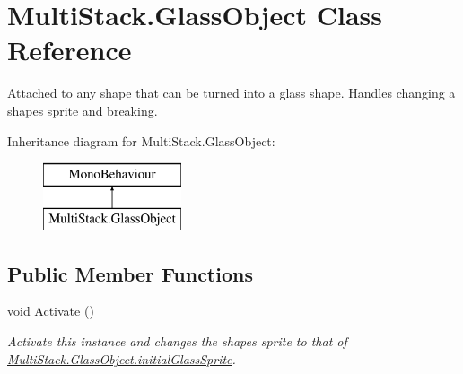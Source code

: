 \hypertarget{class_multi_stack_1_1_glass_object}{}\section{Multi\+Stack.\+Glass\+Object Class Reference}
\label{class_multi_stack_1_1_glass_object}


Attached to any shape that can be turned into a glass shape. Handles changing a shapes sprite and breaking.  


Inheritance diagram for Multi\+Stack.\+Glass\+Object\+:\begin{figure}[H]
\begin{center}
\leavevmode
\includegraphics[height=2.000000cm]{class_multi_stack_1_1_glass_object}
\end{center}
\end{figure}
\subsection*{Public Member Functions}
\begin{DoxyCompactItemize}
\item 
void \hyperlink{class_multi_stack_1_1_glass_object_a7cc0399f29ea62b202cfaf8df9438bad}{Activate} ()
\begin{DoxyCompactList}\small\item\em Activate this instance and changes the shapes sprite to that of \hyperlink{class_multi_stack_1_1_glass_object_a9ef4bb35966c6cb6861b70ee178e5074}{Multi\+Stack.\+Glass\+Object.\+initial\+Glass\+Sprite}. \end{DoxyCompactList}\end{DoxyCompactItemize}
